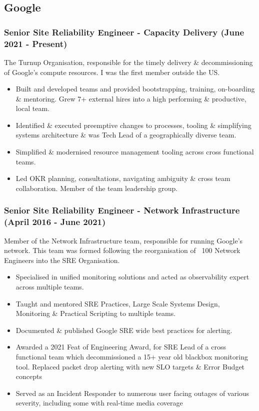 \documentclass[a4paper, 10pt] {article}
\begin{document}
\subsection*{Google}

\subsubsection*{Senior Site Reliability Engineer - Capacity Delivery (June 2021 - Present)}

The Turnup Organisation, responsible for the timely delivery \&
decommissioning of Google's compute resources. I was the first member
outside the US.

\begin{itemize}
\item Built and developed teams and provided bootstrapping, training, 
on-boarding \& mentoring. Grew 7+ external hires into a high performing \&
productive, local team.
\item Identified \& executed preemptive changes to processes, tooling \& simplifying systems
architecture \& was Tech Lead of a geographically diverse team.
\item Simplified \& modernised resource management tooling across cross functional teams.
\item Led OKR planning, consultations, navigating ambiguity \& cross team collaboration. Member
of the team leadership group.
\end{itemize}

\subsubsection*{Senior Site Reliability Engineer - Network Infrastructure (April 2016 - June 2021)}

Member of the Network Infrastructure team, responsible for running
Google's network. This team was formed following the reorganisation of
~100 Network Engineers into the SRE Organisation.

\begin{itemize}
	\item Specialised in unified monitoring solutions and acted as observability expert across multiple teams.
	\item Taught and mentored SRE Practices, Large Scale Systems Design, Monitoring \& Practical Scripting to multiple teams.
	\item Documented \& published Google SRE wide best practices for alerting.
	\item Awarded a 2021 Feat of Engineering Award, for SRE Lead of a cross functional team which decommissioned a 15+ year old blackbox
		monitoring tool. Replaced packet drop alerting with new SLO targets \& Error Budget concepts
	\item Served as an Incident Responder to numerous user facing outages of various severity, including some with real-time media coverage
\end{itemize}
\end{document}
